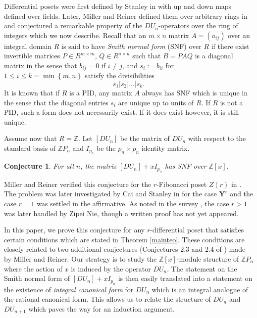 \documentclass[11pt]{article}
\newtheorem{conjecture}[theo]{Conjecture}
\theoremstyle{definition}
\numberwithin{equation}{section}
\newcommand{\ZZ}{\mathbb{Z}}
\begin{document}
Differential posets were first defined by Stanley in \cite{Stanley88} with up and down maps defined over fields. Later, Miller and Reiner defined them over arbitrary rings in \cite{Miller} and conjectured a remarkable property of the $ DU_{n}    $-operators over the ring of integers which we now describe.  Recall that an $ m \times n$ matrix $ A = (a_{ij}) $ over an integral domain $ R $ is said to have \textit{Smith normal form} (SNF) over $ R $ if there exist invertible matrices $ P \in R ^{ m \times m}$, $ Q \in R ^{ n \times n} $ such that $ B = PAQ $ is a diagonal matrix in the sense that $ b_{ij} = 0 $ if $ i \neq j $, and $ s_{i} := b_{ii} $ for $ 1 \leq i \leq k =   \min  \left  \{     m ,  n     \right \} $ satisfy the divisibilities $$ s_{1}| s_{2} | \ldots | s_{k} . $$  It is known that  if     $ R $ is a PID, any matrix $ A $ always has SNF which is unique in the sense that the diagonal entries $ s_{i} $ are unique up to units of $ R $. If $ R $ is not a PID, such a form does not necessarily exist. If it does exist however, it is  still   unique.   

Assume now that $ R =  \ZZ $. Let $ [DU_{n}]$ be the matrix of $ DU_{n} $ with respect to the standard basis of $   \ZZ P_{n} $ and $ I_{p_{n}} $ be the $ p_{n} \times p_{n} $ identity matrix.    
\begin{conjecture}{\cite[Miller-Reiner]{Miller}}  For all $n $, the matrix $  [DU_{n}] + xI_{p_{n}} $ has SNF over $ \ZZ[x] $.      
\label{mainconj}                                                                       
\end{conjecture}
Miller and Reiner verified this conjecture for the $ r $-Fibonacci poset $Z(r)$ in \cite{Miller}. The problem was later investigated by Cai and Stanley in \cite{SNFforYoung} for the case $ \mathbf{Y}^{r} $ and the case $ r = 1 $ was settled in the affirmative. As noted in the survey \cite{SNFsurvey}, the case $ r > 1 $ was later handled by Zipei Nie, though  a written proof has not yet  appeared.                               

In this paper, we prove this conjecture for any $ r$-differential poset that satisfies certain conditions which are stated in Theorem \ref{mainteo}. These conditions %
are  closely related to  two additional conjectures (Conjectures $ 2.3 $ and $ 2.4$ of \cite{Miller}) made by Miller and Reiner.    Our strategy is to study the $ \mathbb{Z}[x] $-module structure of $ \mathbb{Z} P_{n}  $ where the action of $ x $   is induced by the operator $ DU_{n}    $. The statement on the Smith normal form of $ [DU_{n}] + x I_{p_{n}} $ is then easily translated into a statement on the existence of \emph{integral canonical form} for $DU_{n} $ which   is   an integral analogue of the rational canonical form.  This allows us to relate the structure of $ DU_{n} $ and $ DU_{n+1} $    which     paves the way for an induction argument. 
\end{document}
